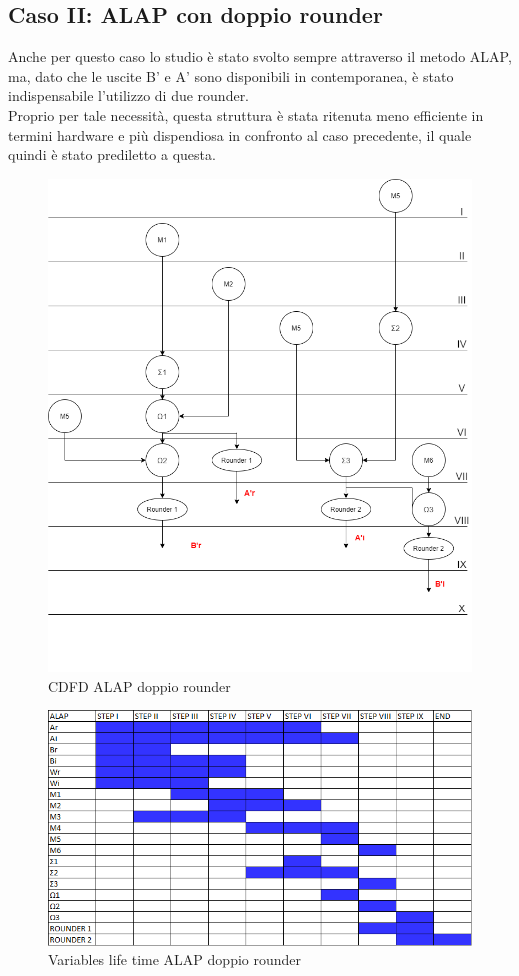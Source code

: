 \documentclass[a4paper, titlepage]{article}
\begin{document}
\subsection{Caso II: ALAP con doppio rounder} %
Anche per questo caso lo studio è stato svolto sempre attraverso il metodo ALAP, ma, dato che le uscite B' e A' sono disponibili in contemporanea, è stato indispensabile l'utilizzo di due rounder.\\Proprio per tale necessità, questa struttura è stata ritenuta meno efficiente in termini hardware e più dispendiosa in confronto al caso precedente, il quale quindi è stato prediletto a questa.
\begin{figure}[!h]
\centering
\includegraphics[scale=0.55]{DFD_ALAP 2.png}
\caption{CDFD ALAP doppio rounder}
\label{fig:ALAP 2}
\end{figure}
\begin{figure}[!h]
\centering
\includegraphics[scale=0.6]{Variables life time ALAP 2.PNG}
\caption{Variables life time ALAP doppio rounder}
\label{fig:tempo di vita delle variabili ALAP 2}
\end{figure}
\newpage
\end{document}
